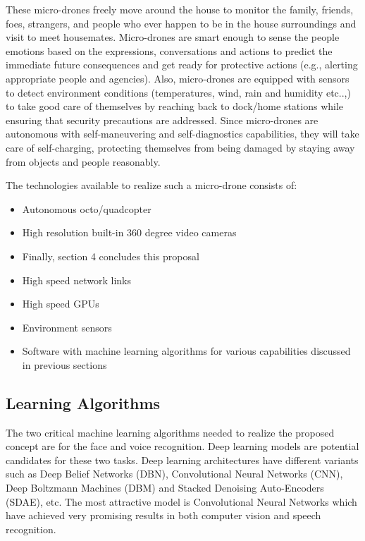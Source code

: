 \documentclass[sigconf]{acmart}
\begin{document}
These micro-drones freely move around the house to monitor the family, friends, foes, strangers, and people who ever happen to be in the house surroundings and visit to meet housemates. Micro-drones are smart enough to sense the people emotions based on the expressions, conversations and actions to predict the immediate future consequences and get ready for protective actions (e.g., alerting appropriate people and agencies). Also, micro-drones are equipped with sensors to detect environment conditions (temperatures, wind, rain and humidity etc..,) to take good care of themselves by reaching back to dock/home stations while ensuring that security precautions are addressed. 
Since micro-drones are autonomous with self-maneuvering and self-diagnostics capabilities, they will take care of self-charging, protecting themselves from being damaged by staying away from objects and people reasonably.

The technologies available to realize such a micro-drone consists of: 
\begin{itemize}
  \item Autonomous octo/quadcopter 
  \item High resolution built-in 360 degree video cameras \item Finally, section 4 concludes this proposal
  \item High speed network links
  \item High speed GPUs
  \item Environment sensors
  \item Software with machine learning algorithms for various capabilities discussed in previous sections
\end{itemize}

\subsection{Learning Algorithms}
The two critical machine learning algorithms needed to realize the proposed concept are for the face and voice recognition. Deep learning models are potential candidates for these two tasks. Deep learning architectures have different variants such as Deep Belief Networks (DBN)\cite{Hinton2009}, Convolutional Neural Networks (CNN)\cite{NIPS2012_4824}, Deep Boltzmann Machines (DBM)\cite{pmlr-v9-salakhutdinov10a} and Stacked Denoising Auto-Encoders (SDAE)\cite{Vincent2010}, etc. The most attractive model is Convolutional Neural Networks which have achieved very promising results in both computer vision and speech recognition.
\end{document}
